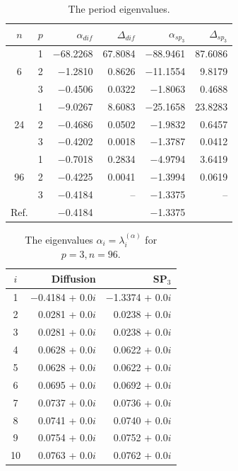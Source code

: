\documentclass[authoryear]{elsarticle}
\begin{document}
\begin{table}[h]
\caption{The period eigenvalues.}
\label{tab:iaea_with_alpha_del}
\begin{center}
\begin{tabular}{c c r r r r}
\hline
$n$ & $p$ & $\alpha_{dif}$ & $\Delta_{dif}$ &$\alpha_{sp_3}$& $\Delta_{sp_3}$ \\
\hline
	& 1	&$-$68.2268 &67.8084& $-$88.9461 &87.6086\\
6	& 2	& $-$1.2810 & 0.8626& $-$11.1554 & 9.8179\\
	& 3	& $-$0.4506 & 0.0322&  $-$1.8063 & 0.4688\\ 
\hline
	& 1	& $-$9.0267  & 8.6083&$-$25.1658 &23.8283\\
24& 2	& $-$0.4686  & 0.0502& $-$1.9832 & 0.6457\\
	& 3	& $-$0.4202  & 0.0018& $-$1.3787 & 0.0412\\ 
\hline
	& 1	& $-$0.7018  & 0.2834& $-$4.9794 & 3.6419\\
96& 2	& $-$0.4225  & 0.0041& $-$1.3994 & 0.0619\\
	& 3	& $-$0.4184  &    -- & $-$1.3375 &    --\\ 
\hline
Ref.& & $-$0.4184 & & $-$1.3375 \\ 
\hline
\end{tabular}
\end{center}
\end{table}

\begin{table}[h]
\caption{The eigenvalues $\alpha_i=\lambda_i^{(\alpha)}$ for $p=3, n=96$.}
\label{tab:iaea_with_alpha_del_10}
\begin{center}
\begin{tabular}{c r r}
\hline
$i$ & Diffusion & SP$_3$ \\
\hline
1& $-$0.4184 + 0.0$i$&$-$1.3374 + 0.0$i$\\
2& 0.0281 + 0.0$i$&0.0238 + 0.0$i$\\
3& 0.0281 + 0.0$i$&0.0238 + 0.0$i$\\
4& 0.0628 + 0.0$i$&0.0622 + 0.0$i$\\
5& 0.0628 + 0.0$i$&0.0622 + 0.0$i$\\
6& 0.0695 + 0.0$i$&0.0692 + 0.0$i$\\
7& 0.0737 + 0.0$i$&0.0736 + 0.0$i$\\
8& 0.0741 + 0.0$i$&0.0740 + 0.0$i$\\
9& 0.0754 + 0.0$i$&0.0752 + 0.0$i$\\
10& 0.0763 + 0.0$i$&0.0762 + 0.0$i$\\
\hline
\end{tabular}
\end{center}
\end{table}
\end{document}
